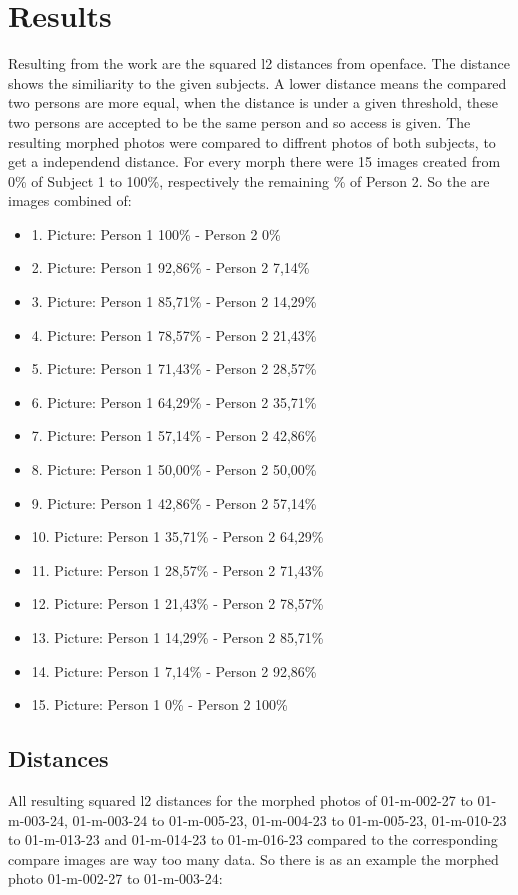 \section{Results}
Resulting from the work are the squared l2 distances from openface. The distance shows the similiarity to the given subjects. A lower distance means the compared two persons are more equal, when the distance is under a given threshold, these two persons are accepted to be the same person and so access is given. The resulting morphed photos were compared to diffrent photos of both subjects, to get a independend distance. For every morph there were 15 images created from 0\% of Subject 1 to 100\%, respectively the remaining \% of Person 2. So the are images combined of:
\begin{itemize}
	\item 1. Picture: Person 1 100\% - Person 2 0\%
	\item 2. Picture: Person 1 92,86\% - Person 2 7,14\%
	\item 3. Picture: Person 1 85,71\% - Person 2 14,29\%
	\item 4. Picture: Person 1 78,57\% - Person 2 21,43\%
	\item 5. Picture: Person 1 71,43\% - Person 2 28,57\%
	\item 6. Picture: Person 1 64,29\% - Person 2 35,71\%
	\item 7. Picture: Person 1 57,14\% - Person 2 42,86\%
	\item 8. Picture: Person 1 50,00\% - Person 2 50,00\%
	\item 9. Picture: Person 1 42,86\% - Person 2 57,14\%
	\item 10. Picture: Person 1 35,71\% - Person 2 64,29\%
	\item 11. Picture: Person 1 28,57\% - Person 2 71,43\%
	\item 12. Picture: Person 1 21,43\% - Person 2 78,57\%
	\item 13. Picture: Person 1 14,29\% - Person 2 85,71\%
	\item 14. Picture: Person 1 7,14\% - Person 2 92,86\%
	\item 15. Picture: Person 1 0\% - Person 2 100\%
\end{itemize}

\subsection{Distances}
All resulting squared l2 distances for the morphed photos of 01-m-002-27 to 01-m-003-24, 01-m-003-24 to 01-m-005-23, 01-m-004-23 to 01-m-005-23, 01-m-010-23 to 01-m-013-23 and 01-m-014-23 to 01-m-016-23 compared to the corresponding compare images are way too many data. So there is as an example the  morphed photo 01-m-002-27 to 01-m-003-24:

